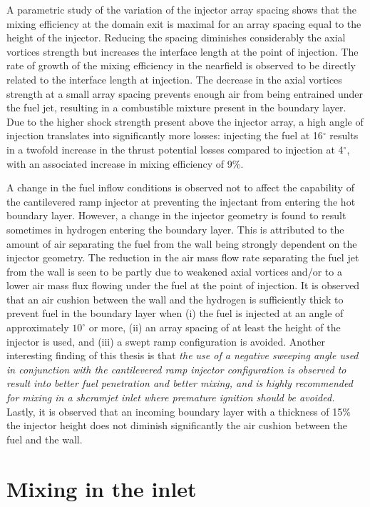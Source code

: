 A parametric study of the variation of the injector array spacing shows that
the mixing efficiency at the domain exit is maximal for an array
spacing equal to the height of the injector. Reducing the spacing diminishes
considerably the axial vortices
strength but increases the interface length at the point
of injection. The rate of growth of the mixing efficiency in the nearfield is observed
to be directly related to the interface length at injection. The
decrease in the axial vortices strength at a small array spacing prevents
enough air from being entrained under the fuel jet, resulting in a
combustible mixture present in the boundary layer.
Due to the higher shock strength present above the injector array, a high angle of injection
translates into significantly more losses: injecting the fuel at 16$^\circ$
results in a twofold increase in the thrust potential losses compared to injection
at 4$^\circ$, with an associated increase in mixing efficiency
of 9\%.

A change in the fuel inflow conditions is observed not to affect the capability of
the cantilevered ramp injector at preventing the injectant from entering the
hot boundary layer. However, a change in the injector geometry
is found to result sometimes in
hydrogen entering the boundary layer. This is attributed to the amount of air separating
the fuel from the wall being strongly dependent on the injector geometry.
The reduction in the air mass flow rate separating the fuel jet from the wall
 is seen to be partly due to weakened
axial vortices and/or to a lower air mass flux flowing under the fuel at the point
of injection. It is observed that an air cushion between the wall and the
hydrogen is sufficiently thick to prevent fuel in the boundary layer
when
(i) the fuel is injected at an angle of approximately $10^\circ$ or more,
(ii) an array spacing of at least the height of the injector is used, and
(iii) a swept ramp configuration is avoided.
Another interesting finding of this thesis is that \emph{the use of a negative sweeping
angle used in conjunction with the cantilevered ramp injector configuration
is observed to result into better fuel penetration and
better mixing, and is highly recommended for mixing in a shcramjet inlet where premature
ignition should be avoided.} Lastly, it is observed that an incoming boundary layer with
a thickness of 15\% the injector height does not diminish significantly the air
cushion between the fuel and the wall.




\section{Mixing in the inlet}

